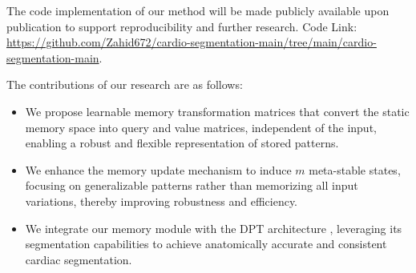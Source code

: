 \documentclass[preprint,12pt]{elsarticle}
\begin{document}
The code implementation of our method will be made publicly available upon publication to support reproducibility and further research. Code Link: \url{https://github.com/Zahid672/cardio-segmentation-main/tree/main/cardio-segmentation-main}.

The contributions of our research are as follows:
\begin{itemize}
    \item We propose learnable memory transformation matrices that convert the static memory space into query and value matrices, independent of the input, enabling a robust and flexible representation of stored patterns.
    \item We enhance the memory update mechanism to induce $m$ meta-stable states, focusing on generalizable patterns rather than memorizing all input variations, thereby improving robustness and efficiency.
    \item We integrate our memory module with the DPT architecture \cite{dpt}, leveraging its segmentation capabilities to achieve anatomically accurate and consistent cardiac segmentation.
\end{itemize}
\end{document}
